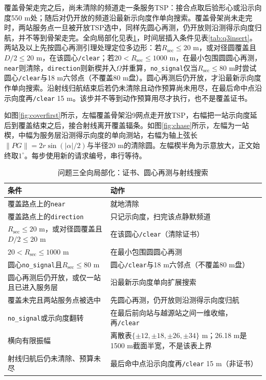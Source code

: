 \documentclass{cumcmthesis}
\begin{document}
覆盖骨架走完之后，尚未清除的频道走一条服务TSP：接合点取后验形心或沿示向度550 m处；随后对仍开放的频道沿最新示向度作单向搜索。覆盖骨架尚未走完时，两站服务点一旦被开放TSP选中，同样先圆心再测，仍开放则沿测得示向度归航，并不等到骨架走完。全向局部化见表\ref{tab:q3chase}，时间层插入条件见表\ref{tab:q3insert}。两站及以上先按圆心再测引理处理定位多边形：若$R_{\mathrm{sec}}\le 20$ m，或对径圆覆盖且$D/2\le 20$ m，在该圆心\texttt{/clear}；若$20<R_{\mathrm{sec}}\le 1000$ m，在最小包围圆圆心再测，\texttt{near}则清除，\texttt{direction}则新楔并入$\Omega$并重算，\texttt{no\_signal}仅当$R_{\mathrm{sec}}\le 80$ m时尝试圆心\texttt{/clear}与18 m六邻点（不覆盖80 m盘）。圆心再测后仍开放，才沿最新示向度作单向搜索。沿射线归航结束后若仍未清除且动作预算尚未用尽，在最后命中点沿示向度再\texttt{/clear} 15 m。该步并不等到动作预算用尽才执行，也不是覆盖证书。

如图\ref{fig:coverfirst}所示，左幅覆盖骨架沿9网点走开放TSP，右幅把一站示向度延后到覆盖结束之后，接合射线离开覆盖辐条。如图\ref{fig:chase}所示，左幅为一站楔，中幅为服务层沿测得示向度的单向测站，右幅为轴上弦长$\|PG\|=2r\sin(|\alpha|/2)$与半径20 m的清除圆。左幅楔半角为示意放大，正文始终取$1^\circ$。每步使用新的请求编号，串行等待。

\begin{table}[htbp]
\centering
\caption{问题三全向局部化：证书、圆心再测与射线搜索}
\label{tab:q3chase}
\begin{tabular}{>{\raggedright\arraybackslash}p{}>{\raggedright\arraybackslash}p{}}
\toprule
条件 & 动作 \\
\midrule
覆盖路点上的\texttt{near} & 就地清除 \\
覆盖路点上的\texttt{direction} & 只记示向度，扫完该点静默频道 \\
$R_{\mathrm{sec}}\le 20$ m，或对径圆覆盖且$D/2\le 20$ m & 在该圆心\texttt{/clear}（清除证书） \\
$20<R_{\mathrm{sec}}\le 1000$ m & 在最小包围圆圆心再测 \\
圆心\texttt{no\_signal}且$R_{\mathrm{sec}}\le 80$ m & 圆心\texttt{/clear}与18 m六邻点（不覆盖80 m盘） \\
圆心再测后仍开放，或仅一站且已进入服务层 & 沿最新示向度单向扩展搜索 \\
覆盖未完且两站服务点被选中 & 先圆心再测，仍开放则沿测得示向度归航 \\
\texttt{no\_signal}或示向度翻转 & 在最后前向站与越源站之间一维收缩，再\texttt{/clear} \\
横向有限振幅 & 离散表$\{\pm 12,\pm 18,\pm 26,\pm 34\}$ m；26.18 m是1500 m截面半宽，不是该表上界 \\
射线归航后仍未清除、预算未尽 & 最后命中点沿示向度再\texttt{/clear} 15 m（非证书） \\
\bottomrule
\end{tabular}
\end{table}
\end{document}
